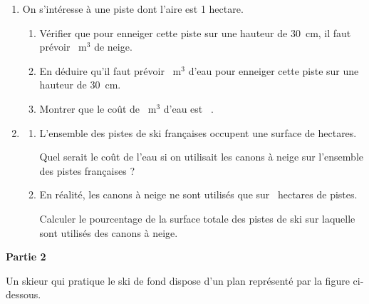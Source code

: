 \documentclass[11pt]{article}
\newcommand{\euro}{\eurologo{}}
\begin{document}
\begin{enumerate}
\item On s’intéresse à une piste dont l’aire est 1 hectare.
	\begin{enumerate}
		\item Vérifier que pour enneiger cette piste sur une hauteur de $30$~cm, il faut prévoir ~m$^3$ de neige.
		\item En déduire qu’il faut prévoir ~m$^3$ d'eau pour enneiger cette piste sur une hauteur de $30$~cm.
		\item Montrer que le coût de ~m$^3$ d’eau est ~\euro.
	\end{enumerate}
\item 
	\begin{enumerate}
		\item L’ensemble des pistes de ski françaises occupent une surface de  hectares.

Quel serait le coût de l’eau si on utilisait les canons à neige sur l’ensemble des pistes françaises ?
		\item En réalité, les canons à neige ne sont utilisés que sur ~hectares de pistes.

Calculer le pourcentage de la surface totale des pistes de ski sur laquelle sont utilisés des canons à neige.
	\end{enumerate}
\end{enumerate}

\medskip

\textbf{Partie 2}

\medskip

Un skieur qui pratique le ski de fond dispose d’un plan représenté par la figure ci-dessous.
\end{document}
